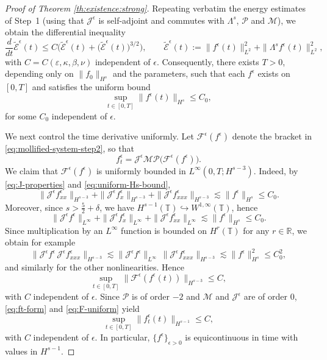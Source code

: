 \documentclass[reqno]{amsart}
\newcommand{\TT}{\mathbb T}
\theoremstyle{definition}
\numberwithin{equation}{section}
\numberwithin{theorem}{section}
\numberwithin{definition}{section}
\begin{document}
\begin{proof}[Proof of Theorem \ref{th:existence:strong}]
Repeating verbatim the energy estimates of Step~1 (using that $\mathcal{J}^\epsilon$ is self-adjoint and commutes with
$\Lambda^s$, $\mathcal{P}$ and $\mathcal{M}$), we obtain the differential inequality
\begin{equation}\label{eq:energy-eps}
	\frac{d}{dt}\widetilde{\mathcal{E}}^\epsilon(t)
	\le C\Big(\widetilde{\mathcal{E}}^\epsilon(t)+\big(\widetilde{\mathcal{E}}^\epsilon(t)\big)^{3/2}\Big),
	\qquad
	\widetilde{\mathcal{E}}^\epsilon(t):=\|f^\epsilon(t)\|_{L^2}^2+\|\Lambda^s f^\epsilon(t)\|_{L^2}^2,
\end{equation}
with $C=C(\varepsilon,\kappa,\beta,\nu)$ independent of $\epsilon$. Consequently, there exists $T>0$, depending only on
$\|f_0\|_{H^s}$ and the parameters, such that each $f^\epsilon$ exists on $[0,T]$ and satisfies the uniform bound
\begin{equation}\label{eq:uniform-Hs-bound}
	\sup_{t\in[0,T]}\|f^\epsilon(t)\|_{H^s}\le C_0,
\end{equation}
for some $C_0$ independent of $\epsilon$.

We next control the time derivative uniformly. Let $\mathcal{F}^\epsilon(f^\epsilon)$ denote the bracket in
\eqref{eq:mollified-system-step2}, so that
\begin{equation}\label{eq:ft-form}
	f^\epsilon_t=\mathcal{J}^\epsilon\mathcal{M}\mathcal{P}\big(\mathcal{F}^\epsilon(f^\epsilon)\big).
\end{equation}
We claim that $\mathcal{F}^\epsilon(f^\epsilon)$ is uniformly bounded in $L^\infty(0,T;H^{s-3})$. Indeed, by
\eqref{eq:J-properties} and \eqref{eq:uniform-Hs-bound},
\[
\|\mathcal{J}^\epsilon f^\epsilon_{xx}\|_{H^{s-3}}+\|\mathcal{J}^\epsilon f^\epsilon_x\|_{H^{s-3}}
+\|\mathcal{J}^\epsilon f^\epsilon_{xxx}\|_{H^{s-3}}
\lesssim \|f^\epsilon\|_{H^s}\le C_0.
\]
Moreover, since $s>\frac52+\delta$, we have $H^{s-1}(\TT)\hookrightarrow W^{1,\infty}(\TT)$, hence
\[
\|\mathcal{J}^\epsilon f^\epsilon\|_{L^\infty}+\|\mathcal{J}^\epsilon f^\epsilon_x\|_{L^\infty}
+\|\mathcal{J}^\epsilon f^\epsilon_{xx}\|_{L^\infty}
\lesssim \|f^\epsilon\|_{H^s}\le C_0.
\]
Since multiplication by an $L^\infty$ function is bounded on $H^{r}(\TT)$ for any $r\in\mathbb{R}$, we obtain for example
\[
\|\mathcal{J}^\epsilon f^\epsilon\,\mathcal{J}^\epsilon f^\epsilon_{xxx}\|_{H^{s-3}}
\lesssim \|\mathcal{J}^\epsilon f^\epsilon\|_{L^\infty}\,\|\mathcal{J}^\epsilon f^\epsilon_{xxx}\|_{H^{s-3}}
\lesssim \|f^\epsilon\|_{H^s}^2\le C_0^2,
\]
and similarly for the other nonlinearities. Hence
\begin{equation}\label{eq:F-uniform}
	\sup_{t\in[0,T]}\|\mathcal{F}^\epsilon(f^\epsilon(t))\|_{H^{s-3}}\le C,
\end{equation}
with $C$ independent of $\epsilon$. Since $\mathcal{P}$ is of order $-2$ and $\mathcal{M}$ and $\mathcal{J}^\epsilon$ are of order $0$,
\eqref{eq:ft-form} and \eqref{eq:F-uniform} yield
\begin{equation}\label{eq:dt-uniform}
	\sup_{t\in[0,T]}\|f^\epsilon_t(t)\|_{H^{s-1}}\le C,
\end{equation}
with $C$ independent of $\epsilon$. In particular, $\{f^\epsilon\}_{\epsilon>0}$ is equicontinuous in time with values in $H^{s-1}$.


\end{proof}
\end{document}
